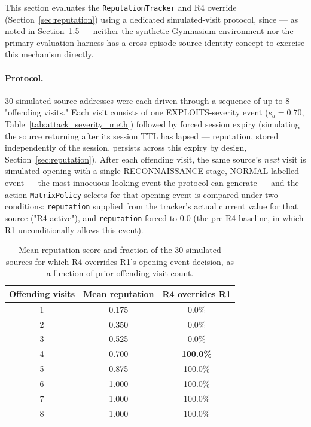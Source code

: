 This section evaluates the \texttt{ReputationTracker} and R4 override
(Section~\ref{sec:reputation}) using a dedicated simulated-visit protocol,
since — as noted in Section~1.5 — neither the synthetic Gymnasium
environment nor the primary evaluation harness has a cross-episode
source-identity concept to exercise this mechanism directly.

\paragraph{Protocol.}
30 simulated source addresses were each driven through a sequence of up to
8 "offending visits." Each visit consists of one EXPLOITS-severity event
($s_a = 0.70$, Table~\ref{tab:attack_severity_meth}) followed by forced
session expiry (simulating the source returning after its session TTL has
lapsed — reputation, stored independently of the session, persists across
this expiry by design, Section~\ref{sec:reputation}). After each offending
visit, the same source's \emph{next} visit is simulated opening with a
single RECONNAISSANCE-stage, NORMAL-labelled event — the most
innocuous-looking event the protocol can generate — and the action
\texttt{MatrixPolicy} selects for that opening event is compared under two
conditions: \texttt{reputation} supplied from the tracker's actual current
value for that source ("R4 active"), and \texttt{reputation} forced to 0.0
(the pre-R4 baseline, in which R1 unconditionally allows this event).

\begin{table}[ht]
  \centering
  \caption{Mean reputation score and fraction of the 30 simulated sources
           for which R4 overrides R1's opening-event decision, as a
           function of prior offending-visit count.}
  \label{tab:reputation}
  \begin{tabular}{ccc}
    \toprule
    Offending visits & Mean reputation & R4 overrides R1 \\
    \midrule
    1 & 0.175 & 0.0\%             \\
    2 & 0.350 & 0.0\%             \\
    3 & 0.525 & 0.0\%             \\
    4 & 0.700 & \textbf{100.0\%}  \\
    5 & 0.875 & 100.0\%           \\
    6 & 1.000 & 100.0\%           \\
    7 & 1.000 & 100.0\%           \\
    8 & 1.000 & 100.0\%           \\
    \bottomrule
  \end{tabular}
\end{table}

